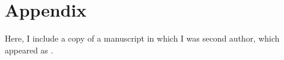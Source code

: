 \chapter{Appendix}

Here, I include a copy of a manuscript in which I was second author, which appeared as \citet{Besserve2015}.


